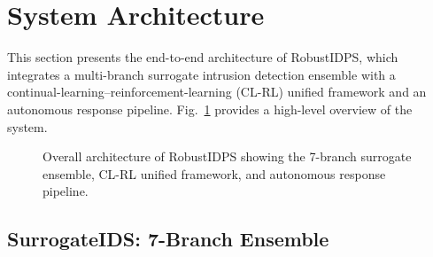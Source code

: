 
\section{System Architecture}
\label{sec:architecture}

This section presents the end-to-end architecture of RobustIDPS, which
integrates a multi-branch surrogate intrusion detection ensemble with a
continual-learning--reinforcement-learning (CL-RL) unified framework and an
autonomous response pipeline.  Fig.~\ref{fig:architecture} provides a
high-level overview of the system.

\begin{figure}[t]
\centering
{}
\caption{Overall architecture of RobustIDPS showing the 7-branch surrogate
ensemble, CL-RL unified framework, and autonomous response pipeline.}
\label{fig:architecture}
\end{figure}

\subsection{SurrogateIDS: 7-Branch Ensemble}
\label{sec:surrogate}

